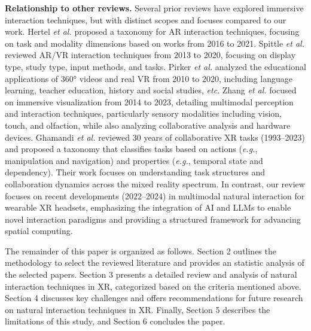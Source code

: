 \documentclass[review]{fcs}
\newcommand{\revise}[2]{\textcolor[rgb]{0,0,0}{#2}}
\begin{document}
\revise{}{\textbf{Relationship to other reviews.} Several prior reviews have explored immersive interaction techniques, but with distinct scopes and focuses compared to our work. Hertel \textit{et al.} \cite{DBLP:conf/ismar/HertelKSBSS21} proposed a taxonomy for AR interaction techniques, focusing on task and modality dimensions based on works from 2016 to 2021. Spittle \textit{et al.} \cite{DBLP:journals/tvcg/SpittlePC023} reviewed AR/VR interaction techniques from 2013 to 2020, focusing on display type, study type, input methods, and tasks. 
Pirker \textit{et al.} \cite{pirker2021potential} analyzed the educational applications of 360° videos and real VR from 2010 to 2020, including language learning, teacher education, history and social studies, \textit{etc}. Zhang \textit{et al.} \cite{DBLP:journals/vi/ZhangWZST23} focused on immersive visualization from 2014 to 2023, detailing multimodal perception and interaction techniques, particularly sensory modalities including vision, touch, and olfaction, while also analyzing collaborative analysis and hardware devices. 
Ghamandi \textit{et al.} \cite{DBLP:conf/ismar/GhamandiHNGKTL23} reviewed 30 years of collaborative XR tasks (1993–2023) and proposed a taxonomy that classifies tasks based on actions (\textit{e.g.}, manipulation and navigation) and properties (\textit{e.g.}, temporal state and dependency). Their work focuses on understanding task structures and collaboration dynamics across the mixed reality spectrum.
In contrast, our review focuses on recent developments (2022–2024) in multimodal natural interaction for wearable XR headsets, emphasizing the integration of AI and LLMs to enable novel interaction paradigms and providing a structured framework for advancing spatial computing.}


The remainder of this paper is organized as follows. \revise{Section 2 outlines the methodology used for selecting the reviewed literature and provides an analysis of the selected papers.}{Section 2 outlines the methodology to select the reviewed literature and provides an statistic analysis of the selected papers.} \revise{Section 3 presents a detailed review and analysis of natural interaction techniques in XR, categorized based on the previously mentioned criteria}{Section 3 presents a detailed review and analysis of natural interaction techniques in XR, categorized based on the criteria mentioned above}. Section 4 discusses key challenges and offers recommendations for future research on natural interaction techniques in XR. Finally, Section 5 describes the limitations of this study, and Section 6 concludes the paper.
\end{document}
